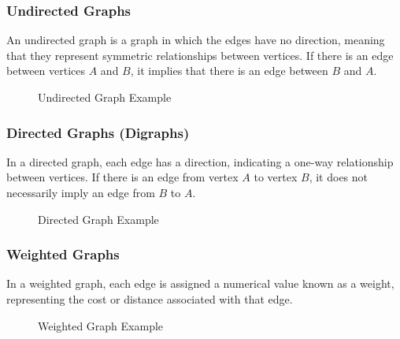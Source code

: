 \documentclass{article}
\begin{document}
\subsubsection{Undirected Graphs}
An undirected graph is a graph in which the edges have no direction, meaning that they represent symmetric relationships between vertices. If there is an edge between vertices $A$ and $B$, it implies that there is an edge between $B$ and $A$.

\begin{figure}[h]
    \centering
    \caption{Undirected Graph Example}
\end{figure}

\subsubsection{Directed Graphs (Digraphs)}
In a directed graph, each edge has a direction, indicating a one-way relationship between vertices. If there is an edge from vertex $A$ to vertex $B$, it does not necessarily imply an edge from $B$ to $A$.

\begin{figure}[h]
    \centering
    \caption{Directed Graph Example}
\end{figure}

\subsubsection{Weighted Graphs}
In a weighted graph, each edge is assigned a numerical value known as a weight, representing the cost or distance associated with that edge.

\begin{figure}[h]
    \centering
    \caption{Weighted Graph Example}
\end{figure}
\end{document}
